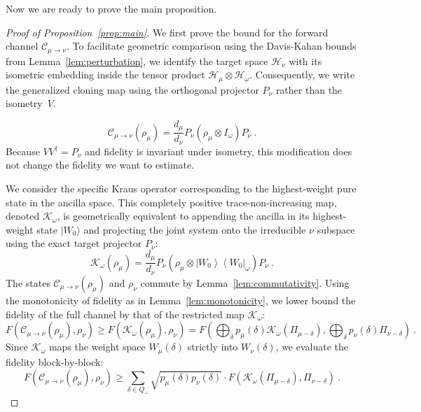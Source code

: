 \documentclass[11pt,letterpaper]{article}
\newcommand{\ketbra}[2]{\left|#1\right\rangle\!\!\left\langle #2\right|}
\def\C{\mathcal{C}}
\begin{document}
Now we are ready to prove the main proposition.

\begin{proof}[Proof of Proposition~\ref{prop:main}]
We first prove the bound for the forward channel $\mathcal{C}_{\mu\to\nu}$. To facilitate geometric comparison using the Davis-Kahan bounds from Lemma~\ref{lem:perturbation}, we identify the target space $\mathcal{H}_\nu$ with its isometric embedding inside the tensor product $\mathcal{H}_\mu \otimes \mathcal{H}_\omega$. Consequently, we write the generalized cloning map using the orthogonal projector $P_\nu$ rather than the isometry~$V$.

\begin{equation}
    \C_{\mu\to\nu}(\rho_\mu) = \frac{d_\mu}{d_\nu} P_\nu \left( \rho_\mu \otimes I_\omega \right) P_\nu \ .
\end{equation}
Because $VV^\dagger = P_\nu$ and fidelity is invariant under isometry, this modification does not change the fidelity we want to estimate.

We consider the specific Kraus operator corresponding to the highest-weight pure state in the ancilla space. This completely positive trace-non-increasing map, denoted $\mathcal{K}_\omega$, is geometrically equivalent to appending the ancilla in its highest-weight state $|W_0\rangle$ and projecting the joint system onto the irreducible $\nu$ subspace using the exact target projector $P_\nu$:
\begin{equation}\label{eq:kraus_proj}
    \mathcal{K}_\omega(\rho_\mu) = \frac{d_\mu}{d_\nu} P_\nu \left( \rho_\mu \otimes \ketbra{W_0}{W_0}_\omega \right) P_\nu \ .
\end{equation}
The states $\mathcal{C}_{\mu\to\nu}(\rho_\mu)$ and $\rho_\nu$ commute by Lemma~\ref{lem:commutativity}. Using the monotonicity of fidelity as in Lemma~\ref{lem:monotonicity}, we lower bound the fidelity of the full channel by that of the restricted map $\mathcal{K}_\omega$:
\begin{equation}
    F(\mathcal{C}_{\mu\to\nu}(\rho_\mu), \rho_\nu) \ge F(\mathcal{K}_\omega(\rho_\mu), \rho_\nu) = F\left(\bigoplus_\delta p_\mu(\delta)\mathcal{K}_\omega(\Pi_{\mu-\delta}), \bigoplus_{\delta} p_\nu(\delta)\Pi_{\nu-\delta}\right) \ .
\end{equation}
Since $\mathcal{K}_\omega$ maps the weight space $W_\mu(\delta)$ strictly into $W_\nu(\delta)$, we evaluate the fidelity block-by-block:
\begin{equation}\label{eq:fidelity1}
   F(\mathcal{C}_{\mu\to\nu}(\rho_\mu), \rho_\nu) \ge \sum_{\delta\in Q_+} \sqrt{p_\mu(\delta)p_\nu(\delta)} \cdot F(\mathcal{K}_\omega(\Pi_{\mu-\delta}), \Pi_{\nu-\delta}) \ .
\end{equation}


\end{proof}
\end{document}
